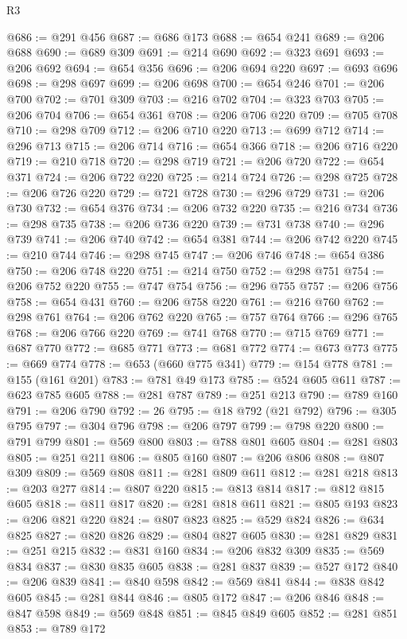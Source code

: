 \begin{lexlean}{R3}
\begin{coremodule}
@686 := @291 @456
@687 := @686 @173
@688 := @654 @241
@689 := @206 @688
@690 := @689 @309
@691 := @214 @690
@692 := @323 @691
@693 := @206 @692
@694 := @654 @356
@696 := @206 @694 @220
@697 := @693 @696
@698 := @298 @697
@699 := @206 @698
@700 := @654 @246
@701 := @206 @700
@702 := @701 @309
@703 := @216 @702
@704 := @323 @703
@705 := @206 @704
@706 := @654 @361
@708 := @206 @706 @220
@709 := @705 @708
@710 := @298 @709
@712 := @206 @710 @220
@713 := @699 @712
@714 := @296 @713
@715 := @206 @714
@716 := @654 @366
@718 := @206 @716 @220
@719 := @210 @718
@720 := @298 @719
@721 := @206 @720
@722 := @654 @371
@724 := @206 @722 @220
@725 := @214 @724
@726 := @298 @725
@728 := @206 @726 @220
@729 := @721 @728
@730 := @296 @729
@731 := @206 @730
@732 := @654 @376
@734 := @206 @732 @220
@735 := @216 @734
@736 := @298 @735
@738 := @206 @736 @220
@739 := @731 @738
@740 := @296 @739
@741 := @206 @740
@742 := @654 @381
@744 := @206 @742 @220
@745 := @210 @744
@746 := @298 @745
@747 := @206 @746
@748 := @654 @386
@750 := @206 @748 @220
@751 := @214 @750
@752 := @298 @751
@754 := @206 @752 @220
@755 := @747 @754
@756 := @296 @755
@757 := @206 @756
@758 := @654 @431
@760 := @206 @758 @220
@761 := @216 @760
@762 := @298 @761
@764 := @206 @762 @220
@765 := @757 @764
@766 := @296 @765
@768 := @206 @766 @220
@769 := @741 @768
@770 := @715 @769
@771 := @687 @770
@772 := @685 @771
@773 := @681 @772
@774 := @673 @773
@775 := @669 @774
@778 := @653 (@660 @775 @341)
@779 := @154 @778
@781 := @155 (@161 @201)
@783 := @781 @49 @173
@785 := @524 @605 @611
@787 := @623 @785 @605
@788 := @281 @787
@789 := @251 @213
@790 := @789 @160
@791 := @206 @790
@792 := 26
@795 := @18 @792 (@21 @792)
@796 := @305 @795
@797 := @304 @796
@798 := @206 @797
@799 := @798 @220
@800 := @791 @799
@801 := @569 @800
@803 := @788 @801 @605
@804 := @281 @803
@805 := @251 @211
@806 := @805 @160
@807 := @206 @806
@808 := @807 @309
@809 := @569 @808
@811 := @281 @809 @611
@812 := @281 @218
@813 := @203 @277
@814 := @807 @220
@815 := @813 @814
@817 := @812 @815 @605
@818 := @811 @817
@820 := @281 @818 @611
@821 := @805 @193
@823 := @206 @821 @220
@824 := @807 @823
@825 := @529 @824
@826 := @634 @825
@827 := @820 @826
@829 := @804 @827 @605
@830 := @281 @829
@831 := @251 @215
@832 := @831 @160
@834 := @206 @832 @309
@835 := @569 @834
@837 := @830 @835 @605
@838 := @281 @837
@839 := @527 @172
@840 := @206 @839
@841 := @840 @598
@842 := @569 @841
@844 := @838 @842 @605
@845 := @281 @844
@846 := @805 @172
@847 := @206 @846
@848 := @847 @598
@849 := @569 @848
@851 := @845 @849 @605
@852 := @281 @851
@853 := @789 @172

\end{coremodule}
\end{lexlean}
